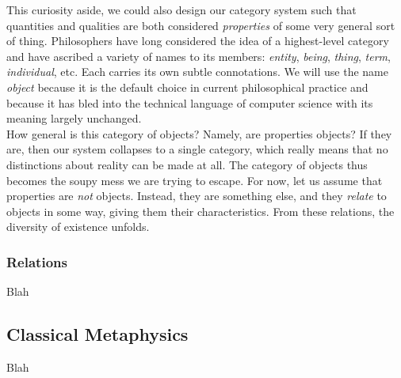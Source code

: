 
This curiosity aside, we could also design our category system such that quantities and qualities are both considered \textit{properties} of some very general sort of thing. Philosophers have long considered the idea of a highest-level category and have ascribed a variety of names to its members: \textit{entity}, \textit{being}, \textit{thing}, \textit{term}, \textit{individual}, etc. Each carries its own subtle connotations. We will use the name \textit{object} because it is the default choice in current philosophical practice and because it has bled into the technical language of computer science with its meaning largely unchanged. \\

How general is this category of objects? Namely, are properties objects? If they are, then our system collapses to a single category, which really means that no distinctions about reality can be made at all. The category of objects thus becomes the soupy mess we are trying to escape. For now, let us assume that properties are \textit{not} objects. Instead, they are something else, and they \textit{relate} to objects in some way, giving them their characteristics. From these relations, the diversity of existence unfolds. \\

\subsubsection{Relations}

Blah


\subsection{Classical Metaphysics}

Blah


